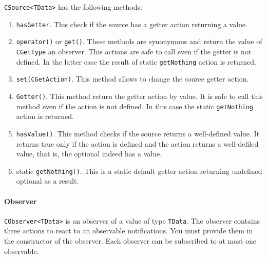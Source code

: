 \documentclass{article}
\begin{document}
\verb"CSource<TData>" has the following methods:
\begin{enumerate}
\item \verb"hasGetter". This check if the source has a getter action returning a value.
\item \verb"operator()" or \verb"get()". These methods are synonymous and return the value of \verb"CGetType" an observer. This actions are safe to call even if the getter is not defined. In the latter case the result of static \verb"getNothing" action is returned.
\item \verb"set(CGetAction)". This method allows to change the source getter action.
\item \verb"Getter()". This method return the getter action by value. It is safe to call this method even if the action is not defined. In this case the static \verb"getNothing" action is returned.
\item \verb"hasValue()". This method checks if the source returns a well-defined value. It returns true only if the action is defined and the action returns a well-defiled value, that is, the optional indeed has a value.

\item static \verb"getNothing()". This is a static default getter action returning undefined optional as a result.
\end{enumerate}

\paragraph{Observer}

\verb"CObserver<TData>" is an observer of a value of type \verb"TData". The observer contains three actions to react to an observable notifications. You must provide them in the constructor of the observer. Each observer can be subscribed to at most one observable.
\end{document}
